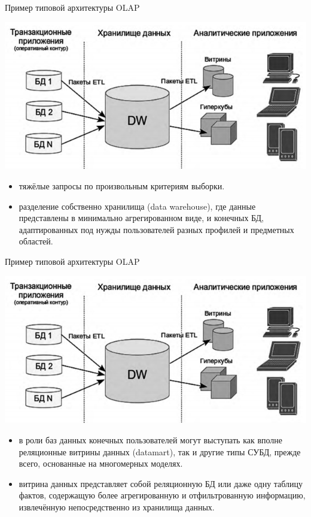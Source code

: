 \documentclass{beamer}
\begin{document}
\begin{frame}
\begin{block}{Пример типовой архитектуры OLAP}
\begin{center}
\includegraphics[scale=0.5]{images/olap.png}
\end{center}
\end{block}
\begin{itemize}
\item тяжёлые запросы по произвольным критериям выборки.
\item разделение собственно хранилища (data warehouse), где данные представлены в
минимально агрегированном виде, и конечных БД, адаптированных под
нужды пользователей разных профилей и предметных областей.
\end{itemize}
\end{frame}

\begin{frame}
\begin{block}{Пример типовой архитектуры OLAP}
\begin{center}
\includegraphics[scale=0.5]{images/olap.png}
\end{center}
\end{block}
\begin{itemize}
\item в роли баз данных конечных пользователей могут выступать как вполне
реляционные витрины данных (datamart), так и другие типы СУБД, прежде
всего, основанные на многомерных моделях.
\item витрина данных представляет собой реляционную БД или даже одну
таблицу фактов, содержащую более агрегированную и отфильтрованную
информацию, извлечённую непосредственно из хранилища данных.
\end{itemize}
\end{frame}
\end{document}
